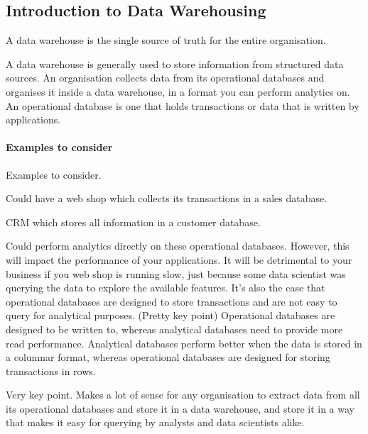 
\subsection{Introduction to Data Warehousing}

\begin{note}
    A data warehouse is the single source of truth for the entire organisation.
\end{note}

A data warehouse is generally used to store information from structured data sources.
An organisation collects data from its operational databases and organises it inside a data warehouse, in a format you can perform analytics on.
An operational database is one that holds transactions or data that is written by applications.

\paragraph{Examples to consider}
Examples to consider.
\begin{item}
    \item Could have a web shop which collects its transactions in a sales database.
    \item CRM which stores all information in a customer database.
\end{item}

Could perform analytics directly on these operational databases.
However, this will impact the performance of your applications.
It will be detrimental to your business if you web shop is running slow, just because some data scientist was querying the data to explore the available features.
It's also the case that operational databases are designed to store transactions and are not easy to query for analytical purposes. (Pretty key point)
Operational databases are designed to be written to, whereas analytical databases need to provide more read performance.
Analytical databases perform better when the data is stored in a columnar format, whereas operational databases are designed for storing transactions in rows.

\begin{note}
    Very key point.
    Makes a lot of sense for any organisation to extract data from all its operational databases and store it in a data warehouse,
    and store it in a way that makes it easy for querying by analysts and data scientists alike.
\end{note}

